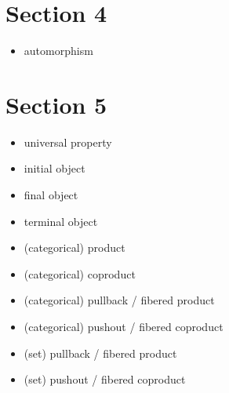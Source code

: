 \documentclass[12pt, letterpaper, twoside]{report}
\begin{document}
\section*{Section 4}

\begin{itemize}
	\item automorphism
\end{itemize}

\section*{Section 5}

\begin{itemize}
	\item universal property
	\item initial object
	\item final object
	\item terminal object
	\item (categorical) product
	\item (categorical) coproduct
	\item (categorical) pullback / fibered product
	\item (categorical) pushout / fibered coproduct
	\item (set) pullback / fibered product
	\item (set) pushout / fibered coproduct
\end{itemize}
\end{document}
